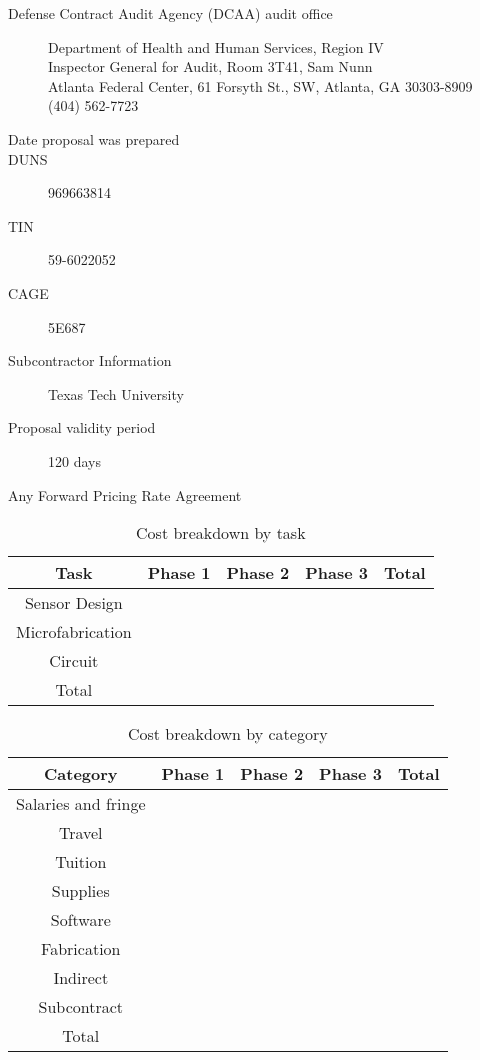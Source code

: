 \begin{description}
\item [Defense Contract Audit Agency (DCAA) audit office]
  \begin{description}
  \item [Department of Health and Human Services, Region IV]
  \item [Inspector General for Audit, Room 3T41, Sam Nunn]
  \item [Atlanta Federal Center, 61 Forsyth St., SW, Atlanta, GA 30303-8909]
  \item [(404) 562-7723]
  \end{description}
\item [Date proposal was prepared]
\item [DUNS] 969663814
\item [TIN] 59-6022052
\item [CAGE] 5E687
\item [Subcontractor Information] Texas Tech University
\item [Proposal validity period] 120 days
\item [Any Forward Pricing Rate Agreement]
  
\end{description}


\setcounter{section}{0}
\begin{table}[h!]
  \centering
  \begin{tabular}{|c||c|c|c|c|}
    \hline
    Task & Phase 1 & Phase 2 & Phase 3 & Total\\
    \hline
    \hline
    Sensor Design & & & & \\
    \hline
    Microfabrication & & & & \\
    \hline
    Circuit & & & & \\
    \hline
    Total & & & & \\
    \hline
  \end{tabular}
  \caption{Cost breakdown by task}
  \label{tab:taskcost}
\end{table}

\begin{table}[h!]
  \centering
  \begin{tabular}{|c||c|c|c|c|}
    \hline
    Category & Phase 1 & Phase 2 & Phase 3 & Total\\
    \hline
    \hline
    Salaries and fringe & & & & \\
    \hline
    Travel & & & & \\
    \hline
    Tuition & & & & \\
    \hline
    Supplies & & & & \\
    \hline
    Software & & & & \\
    \hline
    Fabrication & & & & \\
    \hline
    Indirect & & & & \\
    \hline
    Subcontract & & & & \\
    \hline
    Total & & & & \\
    \hline
  \end{tabular}
  \caption{Cost breakdown by category}
  \label{tab:catcost}
\end{table}

